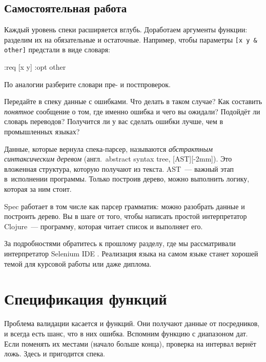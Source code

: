 \subsection{Самостоятельная работа}


Каждый уровень спеки расширяется вглубь. Доработаем аргументы функции: разделим
их на обязательные и остаточные. Например, чтобы параметры \verb|[x y & other]|
предстали в виде словаря:

\begin{english}
  \begin{clojure}
{:req [x y] :opt other}
  \end{clojure}
\end{english}

\noindent
По аналогии разберите словари пре- и постпроверок.

Передайте в спеку данные с ошибками. Что делать в таком случае? Как составить
\emph{понятное} сообщение о том, где именно ошибка и чего вы ожидали? Подойдёт ли
словарь переводов? Получится ли у вас сделать ошибки лучше, чем в промышленных
языках?

Данные, которые вернула спека-парсер, называются \emph{абстрактным синтаксическим деревом}
(англ.~abstract syntax tree, [AST][-2mm]).
Это вложенная структура, которую получают из текста. AST~--- важный этап в~исполнении
программы. Только построив дерево, можно выполнить логику, которая за ним стоит.


Spec работает в том числе как парсер грамматик: можно разобрать данные и
построить дерево. Вы в шаге от того, чтобы написать простой интерпретатор
Clojure~--- программу, которая читает список и выполняет его.

За подробностями обратитесь к прошлому разделу, где мы рассматривали
интерпретатор Selenium IDE . Реализация языка на самом языке
станет хорошей темой для курсовой работы или даже диплома.

\section{Спецификация функций}


Проблема валидации касается и функций. Они получают данные от посредников, и
всегда есть шанс, что в них ошибка. Вспомним функцию с диапазоном дат. Если
поменять их местами (начало больше конца), проверка на интервал вернёт
ложь. Здесь и пригодится спека.

